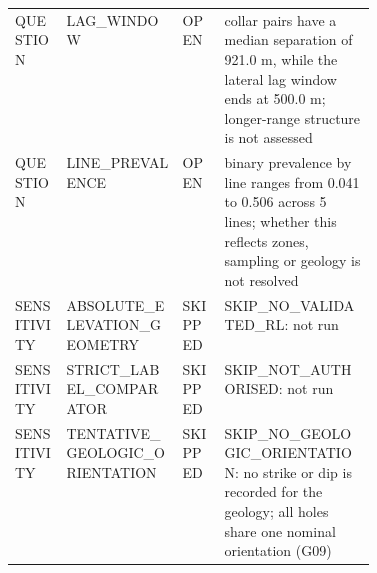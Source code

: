 \begin{table}[ht]
\begin{tabular}{lllp{0.42\linewidth}}
QUESTION & LAG\_WINDOW & OPEN & collar pairs have a median separation of 921.0 m, while the lateral lag window ends at 500.0 m; longer-range structure is not assessed \\
QUESTION & LINE\_PREVALENCE & OPEN & binary prevalence by line ranges from 0.041 to 0.506 across 5 lines; whether this reflects zones, sampling or geology is not resolved \\
SENSITIVITY & ABSOLUTE\_ELEVATION\_GEOMETRY & SKIPPED & SKIP\_NO\_VALIDATED\_RL: not run \\
SENSITIVITY & STRICT\_LABEL\_COMPARATOR & SKIPPED & SKIP\_NOT\_AUTHORISED: not run \\
SENSITIVITY & TENTATIVE\_GEOLOGIC\_ORIENTATION & SKIPPED & SKIP\_NO\_GEOLOGIC\_ORIENTATION: no strike or dip is recorded for the geology; all holes share one nominal orientation (G09) \\
\bottomrule
\end{tabular}
\end{table}
